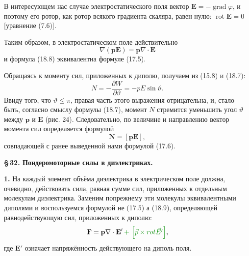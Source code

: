 \documentclass[a4paper,10pt]{article}
\newcommand{\modmath}[1]{\textcolor{modcolor}{#1}}
\begin{document}
В интересующем нас случае электростатического поля вектор
$\mathbf{E} = -\operatorname{grad}\varphi$, и поэтому его ротор, как
ротор всякого градиента скаляра, равен нулю:
$\operatorname{rot}\mathbf{E} = 0$ [уравнение (7.6)].

Таким образом, в электростатическом поле действительно
\begin{equation}
    \nabla(\mathbf{p}\mathbf{E}) = \mathbf{p}\nabla\cdot\mathbf{E}
    \tag{18.10}
\end{equation}
и формула (18.8) эквивалентна формуле (17.5).

Обращаясь к моменту сил, приложенных к диполю, получаем из (15.8)
и (18.7):
$$
    N = -\frac{\partial W}{\partial\vartheta} = -pE\sin\vartheta.
$$
Ввиду того, что $\vartheta \leqslant \pi$, правая часть этого выражения
отрицательна, и, стало быть, согласно смыслу формулы (18.7), момент
$N$ стремится уменьшить угол $\vartheta$ между $\mathbf{p}$ и $\mathbf{E}$
(рис. 24). Следовательно, по величине и направлению вектор момента
сил определяется формулой
\begin{equation}
    \mathbf{N} = [\mathbf{p}\mathbf{E}],
    \tag{18.11}
\end{equation}
совпадающей с ранее выведенной нами формулой (17.6).



%
%
%

\bigskip
\noindent\textbf{\S\,32. Пондеромоторные силы в диэлектриках.}

\medskip
\textbf{1.} На каждый элемент объёма диэлектрика в электрическом поле
должна, очевидно, действовать сила, равная сумме сил, приложенных к
отдельным молекулам диэлектрика. Заменим попрежнему эти молекулы
эквивалентными диполями и воспользуемся формулой не (17.5) а (18.9), определяющей
равнодействующую сил, приложенных к диполю:
$$
    \mathbf{F} = \mathbf{p}\nabla\cdot\mathbf{E}' \modmath{\,+\, \left[\vec{p} \times rot \vec{E'}\right]},
$$
где $\mathbf{E}'$ означает напряжённость действующего на диполь поля.
\end{document}
